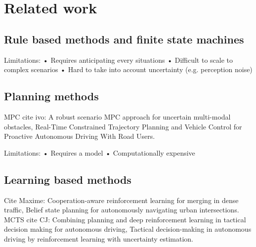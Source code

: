\chapter{Related work}\label{chapter:related_work}

\section{Rule based methods and finite state machines}
Limitations:
• Requires anticipating every situations
• Difficult to scale to complex scenarios
• Hard to take into account uncertainty (e.g. perception noise)

\section{Planning methods}

MPC cite ivo:
A robust scenario MPC approach for uncertain multi-modal obstacles,
Real-Time Constrained Trajectory Planning and Vehicle Control for Proactive Autonomous Driving With Road Users.

Limitations:
• Requires a model
• Computationally expensive

\section{Learning based methods}
Cite Maxime: 
Cooperation-aware reinforcement learning for merging in dense traffic, 
Belief state planning for autonomously navigating urban intersections.
MCTS cite CJ:
Combining planning and deep reinforcement learning in tactical decision making for autonomous driving,
Tactical decision-making in autonomous driving by reinforcement learning with uncertainty estimation.




